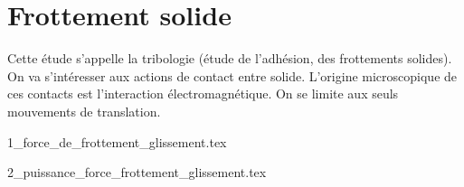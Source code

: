 \chapter{Frottement solide}

Cette étude s'appelle la tribologie (étude de l'adhésion, des frottements solides). On va s'intéresser aux actions de contact entre solide. L'origine microscopique de ces contacts est l'interaction électromagnétique. On se limite aux seuls mouvements de translation.

\minitoc 

{1_force_de_frottement_glissement.tex}

{2_puissance_force_frottement_glissement.tex}